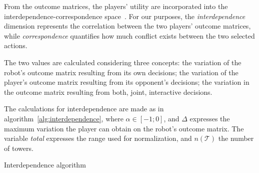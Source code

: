 From the outcome matrices, the players' utility are incorporated into the interdependence-correspondence space~\citep{wagner_acting_2011}. For our purposes, the \textit{interdependence} dimension represents the correlation between the two players' outcome matrices, while \textit{correspondence} quantifies how much conflict exists between the two selected actions.

The two values are calculated considering three concepts: the variation of the robot's outcome matrix resulting from its own decisions; the variation of the player's outcome matrix resulting from its opponent's decisions; the variation in the outcome matrix resulting from both, joint, interactive decisions.

The calculations for interdependence are made as in algorithm~\ref{alg:interdependence}, where $\alpha \in[-1;0]$, and $\Delta$ expresses the maximum variation the player can obtain on the robot's outcome matrix. The variable \textit{total} expresses the range used for normalization, and $n(\mathcal{T})$ the number of towers.

\begin{algorithm}[h]
\SetAlgoLined
{}
\BlankLine
{}
\caption{Interdependence algorithm}
\label{alg:interdependence}
\end{algorithm}

